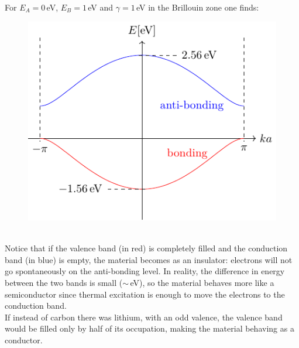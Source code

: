 \documentclass[10.75pt,a4paper,openright,bottom=2cm]{article}
\begin{document}
For $E_A=0$\,eV, $E_B=1$\,eV and $\gamma=1$\,eV in the  Brillouin zone one finds:
\begin{figure}[h]
    \centering
    \includegraphics{polybands.pdf}
    \label{fig:polybands}
\end{figure}\\
\noindent
Notice that if the valence band (in red) is completely filled and the conduction band (in blue) is empty, the material becomes as an insulator: electrons will not go spontaneously on the anti-bonding level. In reality, the difference in energy between the two bands is small ($\sim$\,eV), so the material behaves more like a semiconductor since thermal excitation is enough to move the electrons to the conduction band.\\
If instead of carbon there was lithium, with an odd valence, the valence band would be filled only by half of its occupation, making the material behaving as a conductor.
\newpage
\end{document}
